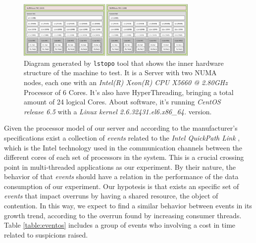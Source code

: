 \documentclass[journal]{IEEEtran}
\begin{document}
\begin{figure}[!h]
\centering
  \includegraphics[width=3.45in]{Imagenes/24cores}
  \caption{Diagram generated by \texttt{lstopo} tool that shows the inner hardware structure of the machine to test. It is a Server with two NUMA nodes, each one with an \emph{Intel(R) Xeon(R) CPU X5660 @ 2.80GHz} Processor of 6 Cores. It's also have HyperThreading, bringing a total amount of 24 logical Cores. About software, it's running \emph{CentOS release 6.5} with a \emph{Linux kernel 2.6.32\-431.el6.x86\_64.} version.}
  \label{fig:24cores}
\end{figure}

Given the processor model of our server and according to the manufacturer's specifications \cite{bib:manual} exist a collection of \emph{events} related to the \emph{Intel QuickPath Link} \cite{bib:intelQPI}, which is the Intel technology used in the communication channels between the different cores of each set of processors in the system. This is a crucial crossing point in multi-threaded applications as our experiment. By their nature, the behavior of that \emph{events} should have a relation in the performance of the data consumption of our experiment. Our hypotesis is that exists an specific set of \emph{events} that impact overruns by having a shared resource, the object of contention. In this way, we expect to find a similar behavior between events in its growth trend, according to the overrun found by increasing consumer threads. Table \ref{table:eventos} includes a group of events who involving a cost in time related to suspicions raised.
\end{document}
